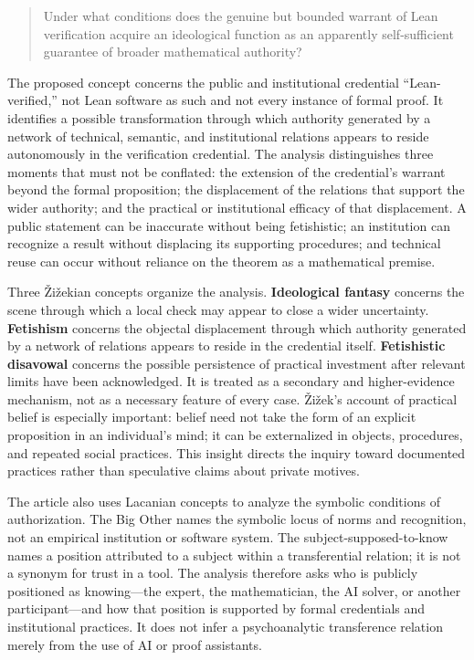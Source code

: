 \documentclass[sn-apa]{sn-jnl}
\begin{document}
\begin{quote}
Under what conditions does the genuine but bounded warrant of Lean verification acquire an ideological function as an apparently self-sufficient guarantee of broader mathematical authority?
\end{quote}

The proposed concept concerns the public and institutional credential “Lean-verified,” not Lean software as such and not every instance of formal proof. It identifies a possible transformation through which authority generated by a network of technical, semantic, and institutional relations appears to reside autonomously in the verification credential. The analysis distinguishes three moments that must not be conflated: the extension of the credential’s warrant beyond the formal proposition; the displacement of the relations that support the wider authority; and the practical or institutional efficacy of that displacement. A public statement can be inaccurate without being fetishistic; an institution can recognize a result without displacing its supporting procedures; and technical reuse can occur without reliance on the theorem as a mathematical premise.

Three Žižekian concepts organize the analysis. \textbf{Ideological fantasy} concerns the scene through which a local check may appear to close a wider uncertainty. \textbf{Fetishism} concerns the objectal displacement through which authority generated by a network of relations appears to reside in the credential itself. \textbf{Fetishistic disavowal} concerns the possible persistence of practical investment after relevant limits have been acknowledged. It is treated as a secondary and higher-evidence mechanism, not as a necessary feature of every case. Žižek’s account of practical belief is especially important: belief need not take the form of an explicit proposition in an individual’s mind; it can be externalized in objects, procedures, and repeated social practices. This insight directs the inquiry toward documented practices rather than speculative claims about private motives.

The article also uses Lacanian concepts to analyze the symbolic conditions of authorization. The Big Other names the symbolic locus of norms and recognition, not an empirical institution or software system. The subject-supposed-to-know names a position attributed to a subject within a transferential relation; it is not a synonym for trust in a tool. The analysis therefore asks who is publicly positioned as knowing—the expert, the mathematician, the AI solver, or another participant—and how that position is supported by formal credentials and institutional practices. It does not infer a psychoanalytic transference relation merely from the use of AI or proof assistants.
\end{document}
